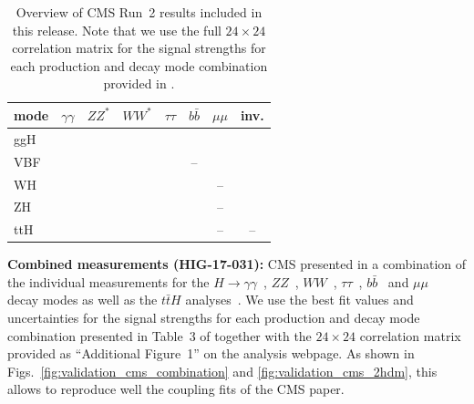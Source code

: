 \begin{table}[h]\centering
\begin{tabular}{l | ccccccc}
mode & $\gamma\gamma$ & $ZZ^*$ & $WW^*$ & $\tau\tau$ & $b\bar b$ & $\mu\mu$ & inv. \\
\hline
ggH & \cite{Sirunyan:2018koj} & \cite{Sirunyan:2018koj} & \cite{Sirunyan:2018koj} & \cite{Sirunyan:2018koj} & \cite{Sirunyan:2018koj} & \cite{Sirunyan:2018koj} & \cite{Sirunyan:2018owy} \\
VBF &  \cite{Sirunyan:2018koj} & \cite{Sirunyan:2018koj} & \cite{Sirunyan:2018koj} & \cite{Sirunyan:2018koj} &-- & \cite{Sirunyan:2018koj} & \cite{Sirunyan:2018owy} \\
WH &  \cite{Sirunyan:2018koj} & \cite{Sirunyan:2018koj} & \cite{Sirunyan:2018koj} & \cite{Sirunyan:2018cpi} & \cite{Sirunyan:2018koj} & -- & \cite{Sirunyan:2018owy} \\
ZH & \cite{Sirunyan:2018koj} & \cite{Sirunyan:2018koj} & \cite{Sirunyan:2018koj} & \cite{Sirunyan:2018cpi} & \cite{Sirunyan:2018koj} & -- & \cite{Sirunyan:2018owy} \\
ttH & \cite{Sirunyan:2018koj} & \cite{Sirunyan:2018koj} & \cite{Sirunyan:2018koj} & \cite{Sirunyan:2018koj} & \cite{Sirunyan:2018koj} & -- & -- \\
\end{tabular}
\caption{Overview of CMS Run~2 results included in this release. Note that we use the full $24\times 24$ correlation matrix 
for the signal strengths for each production and decay mode combination provided in \cite{Sirunyan:2018koj}.}
\label{tab:CMSresults}
\end{table}


{\bf\boldmath Combined measurements (HIG-17-031):} 
CMS presented in \cite{Sirunyan:2018koj} a combination of the individual measurements for the 
$H\to \gamma\gamma$~\cite{Sirunyan:2018ouh}, $ZZ$~\cite{Sirunyan:2017exp}, $WW$~\cite{Sirunyan:2018egh}, 
$\tau\tau$~\cite{Sirunyan:2017khh}, $b\bar b$~\cite{Sirunyan:2017elk,Sirunyan:2017dgc} and $\mu\mu$~\cite{Sirunyan:2018hbu} 
decay modes as well as the $t\bar tH$ analyses~\cite{Sirunyan:2018shy,Sirunyan:2018mvw,Sirunyan:2018ygk}. 
We use the best fit values and uncertainties for the signal strengths for each production %
and decay  %
mode combination presented in Table~3 of \cite{Sirunyan:2018koj} together with the $24\times 24$ correlation matrix 
provided as ``Additional Figure~1'' on the analysis webpage. As shown in Figs.~\ref{fig:validation_cms_combination} 
and \ref{fig:validation_cms_2hdm}, 
this allows to reproduce well the coupling fits of the CMS paper.\\

